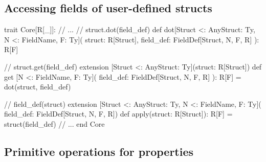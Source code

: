 \documentclass[11pt]{article}
\begin{document}
\subsection*{Accessing fields of user-defined structs}

\begin{ScalaBlockSimple}
trait Core[R[_]]:
  // ...
  // struct.dot(field_def)
  def dot[Struct <: AnyStruct: Ty, N <: FieldName, F: Ty](
    struct: R[Struct],
    field_def: FieldDef[Struct, N, F, R]
  ): R[F]

  // struct.get(field_def)
  extension [Struct <: AnyStruct: Ty](struct: R[Struct])
    def get  [N <: FieldName, F: Ty](
      field_def: FieldDef[Struct, N, F, R]
    ): R[F] = dot(struct, field_def)
    
  // field_def(struct)
  extension [Struct <: AnyStruct: Ty, N <: FieldName, F: Ty](
    field_def: FieldDef[Struct, N, F, R])
    def apply(struct: R[Struct]): R[F] = struct(field_def)
  // ...
end Core
\end{ScalaBlockSimple}



\subsection*{Primitive operations for properties}
\end{document}

